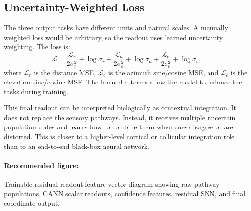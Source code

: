 \subsection{Uncertainty-Weighted Loss}

The three output tasks have different units and natural scales. A manually weighted loss would be arbitrary, so the readout uses learned uncertainty weighting. The loss is:
\begin{equation}
    \mathcal{L} =
    \frac{\mathcal{L}_r}{2\sigma_r^2} + \log\sigma_r
    + \frac{\mathcal{L}_a}{2\sigma_a^2} + \log\sigma_a
    + \frac{\mathcal{L}_e}{2\sigma_e^2} + \log\sigma_e,
\end{equation}
where $\mathcal{L}_r$ is the distance MSE, $\mathcal{L}_a$ is the azimuth sine/cosine MSE, and $\mathcal{L}_e$ is the elevation sine/cosine MSE. The learned $\sigma$ terms allow the model to balance the tasks during training.

This final readout can be interpreted biologically as contextual integration. It does not replace the sensory pathways. Instead, it receives multiple uncertain population codes and learns how to combine them when cues disagree or are distorted. This is closer to a higher-level cortical or collicular integration role than to an end-to-end black-box neural network.

\paragraph{Recommended figure:} Trainable residual readout feature-vector diagram showing raw pathway populations, CANN scalar readouts, confidence features, residual SNN, and final coordinate output.

